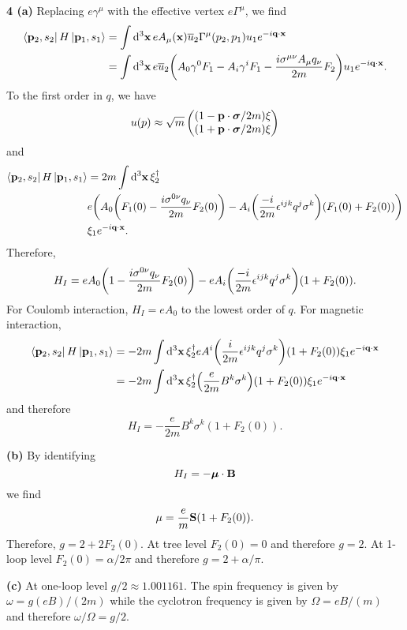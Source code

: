 \documentclass{article}
\makeatletter
\newcommand*{\shifttext}[1]{%
  \settowidth{\@tempdima}{#1}%
  \hspace{-\@tempdima}#1%
}
\newcommand{\plabel}[1]{%
\shifttext{\textbf{#1}\quad}%
}
\makeatother
\begin{document}
\plabel{4 (a)}%
Replacing $e \gamma^\mu$ with the effective vertex $e \Gamma^\mu$, we find
\begin{align*}
    \bra{\vb{p}_2,s_2} H \ket{\vb{p}_1,s_1} &= \int \dd[3]{\vb{x}} e A_\mu(\vb{x}) \overline{u}_2 \Gamma^\mu(p_2,p_1) u_1 e^{-i\vb{q}\cdot \vb{x}} \\
    &= \int \dd[3]{\vb{x}} e \overline{u}_2 \qty(A_0 \gamma^0 F_1 - A_i \gamma^i F_1 - \frac{i \sigma^{\mu\nu} A_\mu q_\nu}{2m} F_2) u_1 e^{-i\vb{q}\cdot \vb{x}} .
\end{align*}
To the first order in $q$, we have
\[ u(p) \approx \sqrt{m} \begin{pmatrix}
    (1-\vb{p}\cdot \vb*{\sigma}/2m)\xi \\
    (1+\vb{p}\cdot \vb*{\sigma}/2m)\xi
\end{pmatrix} \]
and
\begin{align*}
    \bra{\vb{p}_2,s_2} H \ket{\vb{p}_1,s_1} &= 2m \int \dd[3]{\vb{x}} \xi_2^\dagger \\
    & e \qty(A_0 \qty(F_1(0) - \frac{i\sigma^{0\nu} q_\nu}{2m}F_2(0)) - A_i \qty(\frac{-i}{2m} \epsilon^{ijk} q^j \sigma^k) (F_1(0) + F_2(0))) \\
    &\xi_1 e^{-i\vb{q}\cdot \vb{x}} .
\end{align*}
Therefore,
\[ H_I = eA_0 \qty(1 - \frac{i\sigma^{0\nu} q_\nu}{2m}F_2(0)) - eA_i \qty(\frac{-i}{2m} \epsilon^{ijk} q^j \sigma^k) (1 + F_2(0)). \]
For Coulomb interaction, $H_I = e A_0$ to the lowest order of $q$.
For magnetic interaction,
\begin{align*}
    \bra{\vb{p}_2,s_2} H \ket{\vb{p}_1,s_1} &= -2m \int \dd[3]{\vb{x}} \xi^\dagger_2  e A^i\qty(\frac{i}{2m} \epsilon^{ijk} q^j \sigma^k)(1+F_2(0)) \xi_1 e^{-i\vb{q}\cdot \vb{x}} \\
    &= -2m \int \dd[3]{\vb{x}} \xi^\dagger_2  \qty(\frac{e}{2m} B^k \sigma^k)(1+F_2(0)) \xi_1 e^{-i\vb{q}\cdot \vb{x}}
\end{align*}
and therefore
\[ H_I = -\frac{e}{2m} B^k \sigma^k (1+F_2(0)). \]

\plabel{(b)}%
By identifying
\[ H_I = -\vb*{\mu} \cdot \vb{B} \]
we find
\[ \vb{\mu} = \frac{e}{m}\vb{S}(1+F_2(0)). \]
Therefore, $g = 2+2F_2(0)$.
At tree level $F_2(0) = 0$ and therefore $g=2$.
At 1-loop level $F_2(0) = \alpha/2\pi$ and therefore $g = 2+\alpha/\pi$.

\plabel{(c)}%
At one-loop level $g/2 \approx \num{1.001161}$.
The spin frequency is given by $\omega = g(eB)/(2m)$ while the cyclotron frequency is given by $\Omega = eB/(m)$ and therefore $\omega/\Omega = g/2$.
\end{document}
